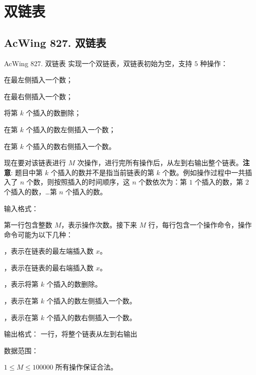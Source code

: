 \section{双链表}

\subsection{AcWing 827. 双链表}
\begin{titledbox}{AcWing 827. 双链表}
    实现一个双链表，双链表初始为空，支持 $5$ 种操作：

    \begin{myenum}
        \item 在最左侧插入一个数；
        \item 在最右侧插入一个数；
        \item 将第 $k$ 个插入的数删除；
        \item 在第 $k$ 个插入的数左侧插入一个数；
        \item 在第 $k$ 个插入的数右侧插入一个数。
    \end{myenum}

    现在要对该链表进行 $M$ 次操作，进行完所有操作后，从左到右输出整个链表。\textbf{注意}: 题目中第 $k$ 个插入的数并不是指当前链表的第 $k$ 个数。例如操作过程中一共插入了 $n$ 个数，则按照插入的时间顺序，这 $n$ 个数依次为：第 $1$ 个插入的数，第 $2$ 个插入的数，…第 $n$ 个插入的数。

    输入格式：

    第一行包含整数 $M$，表示操作次数。接下来 $M$ 行，每行包含一个操作命令，操作命令可能为以下几种：

    \begin{myenum}
        \item {}，表示在链表的最左端插入数 $x$。
        \item {}，表示在链表的最右端插入数 $x$。
        \item {}，表示将第 $k$ 个插入的数删除。
        \item {}，表示在第 $k$ 个插入的数左侧插入一个数。
        \item {}，表示在第 $k$ 个插入的数右侧插入一个数。
    \end{myenum}

    输出格式：
    一行，将整个链表从左到右输出

    数据范围：

    $1 \le M \le 100000$ 所有操作保证合法。


\end{titledbox}
